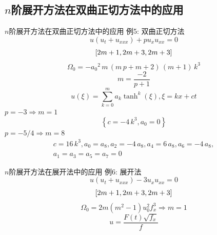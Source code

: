 \subsection{$n$阶展开方法在双曲正切方法中的应用}
\begin{frame}{$n$阶展开方法在双曲正切方法中的应用}
例5: 双曲正切方法
\[
    u(u_t+u_{xxx})+pu_x u_{xx}=0
\]
\[
    \left[2m+1,2m+3,2m+3\right]
\]
\[
    \Omega_0=-{{{a}_{0}}}^{2}\,m\,\left( m\,p+m+2\right) \,\left( m+1\right) \,{k}^{3}
\]
\[
    m=\frac{-2}{p+1}
\]
\[
    u(\xi)=\sum_{k=0}^m{a_k \tanh^k(\xi)}, \xi = kx+ct
\]
$p=-3 \Rightarrow m=1$
\[
    \left\{ c=-4\,{k}^{3},{{a}_{0}}=0\right\}
\]
$p=-5/4\Rightarrow m=8$
\[
\begin{array}{l}
c=16\,{k}^{3},{{a}_{0}}={{a}_{8}},{{a}_{2}}=-4\,{{a}_{8}},{{a}_{4}}=6\,{{a}_{8}},{{a}_{6}}=-4\,{{a}_{8}},\\ 
a_1=a_3=a_5=a_7=0
\end{array}
\]
\end{frame}

\begin{frame}{$n$阶展开方法在\Painleve{}展开法中的应用}
例6: \Painleve{}展开法 
\[
    u(u_t+u_{xxx})-3u_x u_{xx}=0
\]
\[
    \left[2m+1,2m+3,2m+3\right] 
\]
\[
    \Omega_0=2m(m^2-1)u_0^2f_x^3 \Rightarrow m=1
\]
\[
    u=\frac{F(t)\sqrt{f_x}}{f}
\]
\end{frame}
